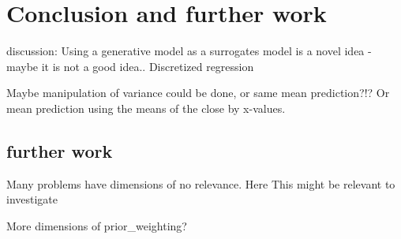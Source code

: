 \chapter{Conclusion and further work}

discussion: Using a generative model as a surrogates model is a novel idea - maybe it is not a good
idea.. 
Discretized regression

Maybe manipulation of variance could be done, or same mean prediction?!? Or 
mean prediction using the means of the close by x-values. 

\section{further work}
Many problems have dimensions of no relevance. Here This might be relevant to investigate

More dimensions of prior_weighting?